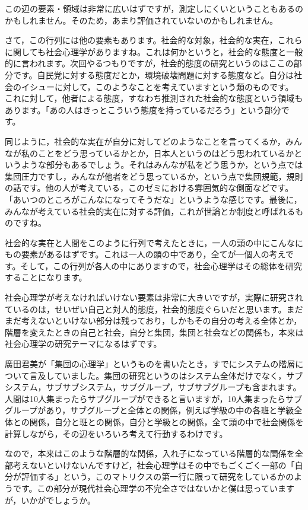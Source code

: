 \documentclass{ltjsbook}
\begin{document}
この辺の要素・領域は非常に広いはずですが，測定しにくいということもあるのかもしれません。そのため，あまり評価されていないのかもしれません。

さて，この行列には他の要素もあります。社会的な対象，社会的な実在，これらに関しても社会心理学がありますね。これは何かというと，社会的な態度と一般的に言われます。次回やるつもりですが，社会的態度の研究というのはここの部分です。自民党に対する態度だとか，環境破壊問題に対する態度など。自分は社会のイシューに対して，このようなことを考えていますという類のものです。
これに対して，他者による態度，すなわち推測された社会的な態度という領域もあります。「あの人はきっとこういう態度を持っているだろう」という部分です。

同じように，社会的な実在が自分に対してどのようなことを言ってくるか，みんなが私のことをどう思っているかとか，日本人というのはどう思われているかというような部分もあるでしょう。それはみんなが私をどう思うか，という点では集団圧力ですし，みんなが他者をどう思っているか，という点で集団規範，規則の話です。他の人が考えている，このゼミにおける雰囲気的な側面などです。「あいつのところがこんなになってそうだな」というような感じです。最後に，みんなが考えている社会的実在に対する評価，これが世論とか制度と呼ばれるものですね。

社会的な実在と人間をこのように行列で考えたときに，一人の頭の中にこんなにもの要素があるはずです。これは一人の頭の中であり，全てが一個人の考えです。そして，この行列が各人の中にありますので，社会心理学はその総体を研究することになります。

社会心理学が考えなければいけない要素は非常に大きいですが，実際に研究されているのは，せいぜい自己と対人的態度，社会的態度ぐらいだと思います。まだまだ考えないといけない部分は残っており，しかもその自分の考える全体とか，階層を変えたときの自己と社会，自分と集団，集団と社会などの関係も，本来は社会心理学の研究テーマになるはずです。

廣田君美が「集団の心理学」\parencite{HirotaKimiyoshi}というものを書いたとき，すでにシステムの階層について言及していました。集団の研究というのはシステム全体だけでなく，サブシステム，サブサブシステム，サブグループ，サブサブグループも含まれます。人間は10人集まったらサブグループができると言いますが，10人集まったらサブグループがあり，サブグループと全体との関係，例えば学級の中の各班と学級全体との関係，自分と班との関係，自分と学級との関係，全て頭の中で社会関係を計算しながら，その辺をいろいろ考えて行動するわけです。

なので，本来はこのような階層的な関係，入れ子になっている階層的な関係を全部考えないといけないんですけど，社会心理学はその中でもごくごく一部の「自分が評価する」という，このマトリクスの第一行に限って研究をしているかのようです。この部分が現代社会心理学の不完全さではないかと僕は思っていますが，いかがでしょうか。
\end{document}
